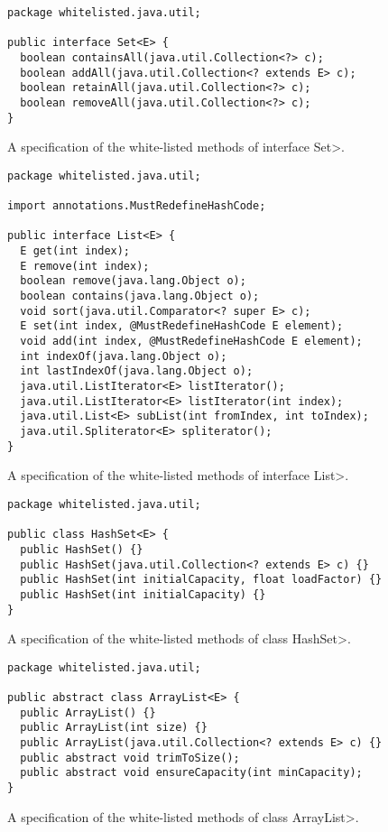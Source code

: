 \begin{figure}[t]
\begin{verbatim}
package whitelisted.java.util;

public interface Set<E> {
  boolean containsAll(java.util.Collection<?> c);
  boolean addAll(java.util.Collection<? extends E> c);
  boolean retainAll(java.util.Collection<?> c);
  boolean removeAll(java.util.Collection<?> c);
}
\end{verbatim}
\caption{A specification of the white-listed methods of interface \<Set>.}
\label{fig:white_listed_Set}
\end{figure}

\begin{figure}[t]
\begin{verbatim}
package whitelisted.java.util;

import annotations.MustRedefineHashCode;

public interface List<E> {
  E get(int index);
  E remove(int index);
  boolean remove(java.lang.Object o);
  boolean contains(java.lang.Object o);
  void sort(java.util.Comparator<? super E> c);
  E set(int index, @MustRedefineHashCode E element);
  void add(int index, @MustRedefineHashCode E element);
  int indexOf(java.lang.Object o);
  int lastIndexOf(java.lang.Object o);
  java.util.ListIterator<E> listIterator();
  java.util.ListIterator<E> listIterator(int index);
  java.util.List<E> subList(int fromIndex, int toIndex);
  java.util.Spliterator<E> spliterator();
}
\end{verbatim}
\caption{A specification of the white-listed methods of interface \<List>.}
\label{fig:white_listed_List}
\end{figure}

\begin{figure}
\begin{verbatim}
package whitelisted.java.util;

public class HashSet<E> {
  public HashSet() {}
  public HashSet(java.util.Collection<? extends E> c) {}
  public HashSet(int initialCapacity, float loadFactor) {}
  public HashSet(int initialCapacity) {}
}
\end{verbatim}
\caption{A specification of the white-listed methods of class \<HashSet>.}
\label{fig:white_listed_HashSet}
\end{figure}

\begin{figure}
\begin{verbatim}
package whitelisted.java.util;

public abstract class ArrayList<E> {
  public ArrayList() {}
  public ArrayList(int size) {}
  public ArrayList(java.util.Collection<? extends E> c) {}
  public abstract void trimToSize();
  public abstract void ensureCapacity(int minCapacity);
}
\end{verbatim}
\caption{A specification of the white-listed methods of class \<ArrayList>.}
\label{fig:white_listed_ArrayList}
\end{figure}

